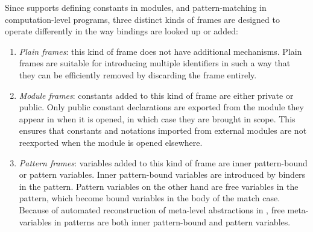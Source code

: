 Since \Beluga supports defining constants in modules, and pattern-matching in computation-level programs, three distinct kinds of frames are designed to operate differently in the way bindings are looked up or added:
\begin{enumerate}
\item
\textit{Plain frames}: this kind of frame does not have additional mechanisms.
Plain frames are suitable for introducing multiple identifiers in such a way that they can be efficiently removed by discarding the frame entirely.
\item
\textit{Module frames}: constants added to this kind of frame are either private or public.
Only public constant declarations are exported from the module they appear in when it is opened, in which case they are brought in scope.
This ensures that constants and notations imported from external modules are not reexported when the module is opened elsewhere.
\item
\textit{Pattern frames}: variables added to this kind of frame are inner pattern-bound or pattern variables.
Inner pattern-bound variables are introduced by binders in the pattern.
Pattern variables on the other hand are free variables in the pattern, which become bound variables in the body of the match case.
Because of automated reconstruction of meta-level abstractions in \Beluga, free meta-variables in patterns are both inner pattern-bound and pattern variables.
\end{enumerate}



